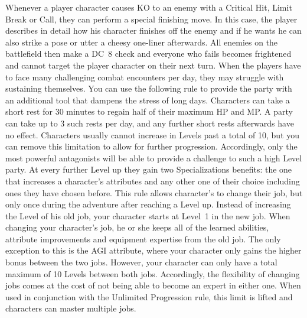 Whenever a player character causes KO to an enemy with a Critical Hit, Limit Break or Call, they can perform a special finishing move.
In this case, the player describes in detail how his character finishes off the enemy and if he wants he can also strike a pose or utter a cheesy one-liner afterwards.
All enemies on the battlefield then make a DC~8 check and everyone who fails becomes frightened and cannot target the player character on their next turn.
%
\clearpage
%
%
\vfill
%
When the players have to face many challenging combat encounters per day, they may struggle with sustaining themselves.
You can use the following rule to provide the party with an additional tool that dampens the stress of long days.
Characters can take a short rest for 30 minutes to regain half of their maximum HP and MP. 
A party can take up to 3 such rests per day, and any further short rests afterwards have no effect.
%
\vfill
%
Characters usually cannot increase in Levels past a total of 10, but you can remove this limitation to allow for further progression.
Accordingly, only the most powerful antagonists will be able to provide a challenge to such a high Level party.
At every further Level up they gain two Specializations benefits:
the one that increases a character's attributes and any other one of their choice including ones they have chosen before.
%
\vfill
%
This rule allows character's to change their job, but only once during the adventure after reaching a Level up.
Instead of increasing the Level of his old job, your character starts at Level~1 in the new job.
When changing your character's job, he or she keeps all of the learned abilities, attribute improvements and equipment expertise from the old job.  
The only exception to this is the AGI attribute, where your character only gains the higher bonus between the two jobs.
However, your character can only have a total maximum of 10 Levels between both jobs.
Accordingly, the flexibility of changing jobs comes at the cost of not being able to become an expert in either one.
When used in conjunction with the Unlimited Progression rule, this limit is lifted and characters can master multiple jobs.
%
\vfill
%
